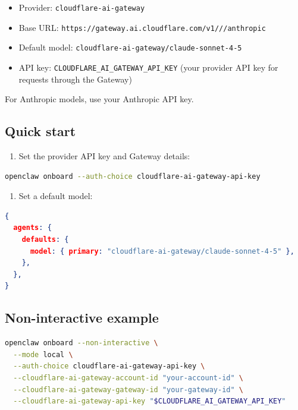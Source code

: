 \begin{itemize}
  \item Provider: \texttt{cloudflare-ai-gateway}
  \item Base URL: \texttt{https://gateway.ai.cloudflare.com/v1///anthropic}
  \item Default model: \texttt{cloudflare-ai-gateway/claude-sonnet-4-5}
  \item API key: \texttt{CLOUDFLARE\_AI\_GATEWAY\_API\_KEY} (your provider API key for requests through the Gateway)
\end{itemize}


For Anthropic models, use your Anthropic API key.

\subsection{Quick start}


\begin{enumerate}
  \item Set the provider API key and Gateway details:
\end{enumerate}


\begin{lstlisting}[language=bash]
openclaw onboard --auth-choice cloudflare-ai-gateway-api-key
\end{lstlisting}


\begin{enumerate}
  \item Set a default model:
\end{enumerate}


\begin{lstlisting}[language=json]
{
  agents: {
    defaults: {
      model: { primary: "cloudflare-ai-gateway/claude-sonnet-4-5" },
    },
  },
}
\end{lstlisting}


\subsection{Non-interactive example}


\begin{lstlisting}[language=bash]
openclaw onboard --non-interactive \
  --mode local \
  --auth-choice cloudflare-ai-gateway-api-key \
  --cloudflare-ai-gateway-account-id "your-account-id" \
  --cloudflare-ai-gateway-gateway-id "your-gateway-id" \
  --cloudflare-ai-gateway-api-key "$CLOUDFLARE_AI_GATEWAY_API_KEY"
\end{lstlisting}


